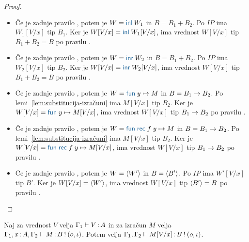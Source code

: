 \begin{proof}
\begin{itemize}
		\item Če je zadnje pravilo , potem je $W = \tminl{W_1}$ in $B = B_1 + B_2$. Po $IP$ ima $W_1[V/x]$ tip $B_1$.
		Ker je $W[V/x] = \tminl{W_1[V/x]}$, ima vrednost $W[V/x]$ tip $B_1 + B_2 = B$ po pravilu .
		
		\item Če je zadnje pravilo , potem je $W = \tminr{W_2}$ in $B = B_1 + B_2$. Po $IP$ ima $W_2[V/x]$ tip $B_2$.
		Ker je $W[V/x] = \tminr{W_2[V/x]}$, ima vrednost $W[V/x]$ tip $B_1 + B_2 = B$ po pravilu .
		
		\item Če je zadnje pravilo , potem je $W = \tmfunano{y}{M}$ in $B = B_1 \to B_2$. Po lemi~\ref{lem:substitucija-izračuni} ima $M[V/x]$ tip $B_2$.
		Ker je $W[V/x] = \tmfunano{y}{M[V/x]}$, ima vrednost $W[V/x]$ tip $B_1 \to B_2$ po pravilu .
		
		\item Če je zadnje pravilo , potem je $W = \tmfunrecano{f}{y}{M}$ in $B = B_1 \to B_2$. Po lemi~\ref{lem:substitucija-izračuni} ima $M[V/x]$ tip $B_2$.
		Ker je $W[V/x] = \tmfunrecano{f}{y}{M[V/x]}$, ima vrednost $W[V/x]$ tip $B_1 \to B_2$ po pravilu .
		
		\item Če je zadnje pravilo , potem je $W = \langle W' \rangle$ in $B = \langle B' \rangle$. Po $IP$ ima $W'[V/x]$ tip $B'$.
		Ker je $W[V/x] = \langle W' \rangle$, ima vrednost $W[V/x]$ tip $\langle B' \rangle = B$ po pravilu .
	\end{itemize}
\end{proof}


\begin{lema}\label{lem:substitucija-izračuni}
	Naj za vrednost $V$ velja $\Gamma_1 \vdash V \mathinner{:} A$ in za izračun $M$ velja $\Gamma_1, x \mathinner{:} A, \Gamma_2 \vdash M \mathinner{:} B \mathbin{!} (o, \iota)$. Potem velja $\Gamma_1, \Gamma_2 \vdash M[V/x] \mathinner{:} B \mathbin{!} (o, \iota)$.
\end{lema}

